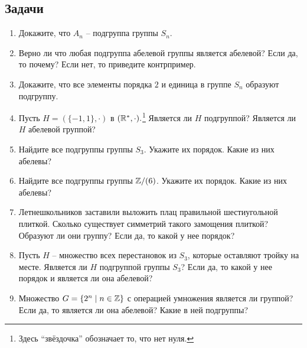 \subsection*{Задачи}
\begin{enumerate}
    \item Докажите, что $A_n$ -- подгруппа группы $S_n$.
    \item Верно ли что любая подгруппа абелевой группы является абелевой?
        Если да, то почему? Если нет, то приведите контрпример.
    \item Докажите, что все элементы порядка $2$ и единица в группе $S_n$ образуют подгруппу. 
    \item Пусть $H = (\{-1, 1\}, \cdot)$ в $(\mathbb R^*, \cdot).$\footnote{
        Здесь ``звёздочка'' обозначает то, что нет нуля.}
        Является ли $H$ подгруппой?
        Является ли $H$ абелевой группой?
    \item Найдите все подгруппы группы $S_3$. Укажите их порядок. 
        Какие из них абелевы?
    \item Найдите все подгруппы группы $\mathbb Z/(6)$. Укажите их порядок. 
        Какие из них абелевы?
    \item Летнешкольников заставили выложить плац правильной шестиугольной плиткой. 
        Сколько существует симметрий такого замощения плиткой? Образуют ли они группу?
        Если да, то какой у нее порядок?
    \item Пусть $H$ -- множество всех перестановок из $S_3$, которые оставляют
        тройку на месте. Является ли $H$ подгруппой группы $S_3$?
        Если да, то какой у нее порядок и является ли она абелевой?
    \item Множество $G = \{2^n \mid n \in \mathbb Z\}$ с операцией умножения является ли группой?
        Если да, то является ли она абелевой? Какие в ней подгруппы?
\end{enumerate}
